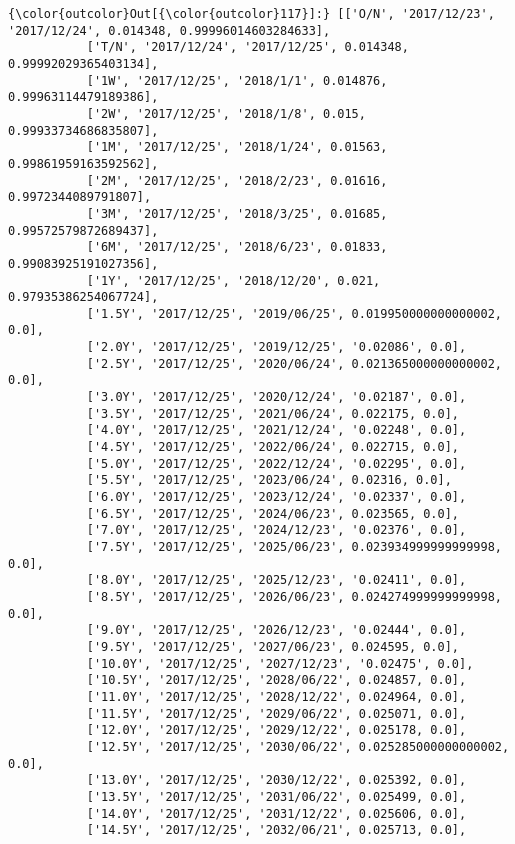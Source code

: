 \documentclass[11pt]{article}
\begin{document}
\begin{Verbatim}[commandchars=\\\{\}]
{\color{outcolor}Out[{\color{outcolor}117}]:} [['O/N', '2017/12/23', '2017/12/24', 0.014348, 0.99996014603284633],
           ['T/N', '2017/12/24', '2017/12/25', 0.014348, 0.99992029365403134],
           ['1W', '2017/12/25', '2018/1/1', 0.014876, 0.99963114479189386],
           ['2W', '2017/12/25', '2018/1/8', 0.015, 0.99933734686835807],
           ['1M', '2017/12/25', '2018/1/24', 0.01563, 0.99861959163592562],
           ['2M', '2017/12/25', '2018/2/23', 0.01616, 0.9972344089791807],
           ['3M', '2017/12/25', '2018/3/25', 0.01685, 0.99572579872689437],
           ['6M', '2017/12/25', '2018/6/23', 0.01833, 0.99083925191027356],
           ['1Y', '2017/12/25', '2018/12/20', 0.021, 0.97935386254067724],
           ['1.5Y', '2017/12/25', '2019/06/25', 0.019950000000000002, 0.0],
           ['2.0Y', '2017/12/25', '2019/12/25', '0.02086', 0.0],
           ['2.5Y', '2017/12/25', '2020/06/24', 0.021365000000000002, 0.0],
           ['3.0Y', '2017/12/25', '2020/12/24', '0.02187', 0.0],
           ['3.5Y', '2017/12/25', '2021/06/24', 0.022175, 0.0],
           ['4.0Y', '2017/12/25', '2021/12/24', '0.02248', 0.0],
           ['4.5Y', '2017/12/25', '2022/06/24', 0.022715, 0.0],
           ['5.0Y', '2017/12/25', '2022/12/24', '0.02295', 0.0],
           ['5.5Y', '2017/12/25', '2023/06/24', 0.02316, 0.0],
           ['6.0Y', '2017/12/25', '2023/12/24', '0.02337', 0.0],
           ['6.5Y', '2017/12/25', '2024/06/23', 0.023565, 0.0],
           ['7.0Y', '2017/12/25', '2024/12/23', '0.02376', 0.0],
           ['7.5Y', '2017/12/25', '2025/06/23', 0.023934999999999998, 0.0],
           ['8.0Y', '2017/12/25', '2025/12/23', '0.02411', 0.0],
           ['8.5Y', '2017/12/25', '2026/06/23', 0.024274999999999998, 0.0],
           ['9.0Y', '2017/12/25', '2026/12/23', '0.02444', 0.0],
           ['9.5Y', '2017/12/25', '2027/06/23', 0.024595, 0.0],
           ['10.0Y', '2017/12/25', '2027/12/23', '0.02475', 0.0],
           ['10.5Y', '2017/12/25', '2028/06/22', 0.024857, 0.0],
           ['11.0Y', '2017/12/25', '2028/12/22', 0.024964, 0.0],
           ['11.5Y', '2017/12/25', '2029/06/22', 0.025071, 0.0],
           ['12.0Y', '2017/12/25', '2029/12/22', 0.025178, 0.0],
           ['12.5Y', '2017/12/25', '2030/06/22', 0.025285000000000002, 0.0],
           ['13.0Y', '2017/12/25', '2030/12/22', 0.025392, 0.0],
           ['13.5Y', '2017/12/25', '2031/06/22', 0.025499, 0.0],
           ['14.0Y', '2017/12/25', '2031/12/22', 0.025606, 0.0],
           ['14.5Y', '2017/12/25', '2032/06/21', 0.025713, 0.0],

\end{Verbatim}
\end{document}
